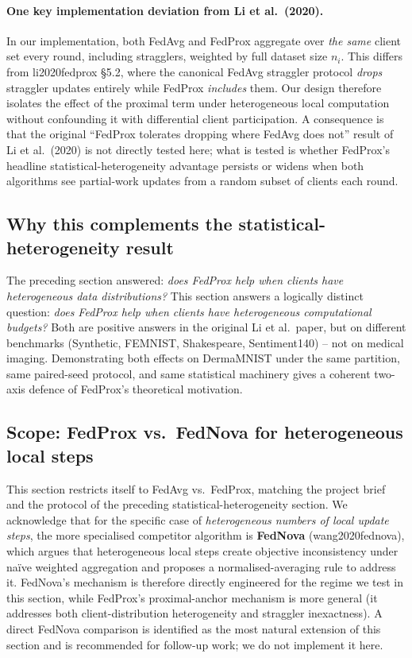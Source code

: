 \documentclass[11pt,a4paper]{article}
\providecommand{\citep}[1]{(#1)}
\providecommand{\citet}[1]{#1}
\begin{document}
\paragraph{One key implementation deviation from Li et al.\ (2020).}
In our implementation, both FedAvg and FedProx aggregate over
\emph{the same} client set every round, including stragglers, weighted
by full dataset size $n_i$. This differs from \citet{li2020fedprox}
§5.2, where the canonical FedAvg straggler protocol \emph{drops}
straggler updates entirely while FedProx \emph{includes} them. Our
design therefore isolates the effect of the proximal term under
heterogeneous local computation without confounding it with
differential client participation. A consequence is that the original
``FedProx tolerates dropping where FedAvg does not'' result of Li
et al.\ (2020) is not directly tested here; what is tested is whether
FedProx's headline statistical-heterogeneity advantage persists or
widens when both algorithms see partial-work updates from a random
subset of clients each round.

\subsection*{Why this complements the statistical-heterogeneity result}

The preceding section answered: \emph{does FedProx help when clients have
heterogeneous data distributions?} This section answers a logically
distinct question: \emph{does FedProx help when clients have heterogeneous
computational budgets?} Both are positive answers in the original Li et
al.\ paper, but on different benchmarks (Synthetic, FEMNIST, Shakespeare,
Sentiment140) -- not on medical imaging. Demonstrating both effects on
DermaMNIST under the same partition, same paired-seed protocol, and same
statistical machinery gives a coherent two-axis defence of FedProx's
theoretical motivation.

\subsection*{Scope: FedProx vs.\ FedNova for heterogeneous local steps}

This section restricts itself to FedAvg vs.\ FedProx, matching the
project brief and the protocol of the preceding statistical-heterogeneity
section. We acknowledge that for the specific case of \emph{heterogeneous
numbers of local update steps}, the more specialised competitor algorithm
is \textbf{FedNova} \citep{wang2020fednova}, which argues that
heterogeneous local steps create objective inconsistency under naïve
weighted aggregation and proposes a normalised-averaging rule to address
it. FedNova's mechanism is therefore directly engineered for the regime
we test in this section, while FedProx's proximal-anchor mechanism is
more general (it addresses both client-distribution heterogeneity and
straggler inexactness). A direct FedNova comparison is identified as
the most natural extension of this section and is recommended for
follow-up work; we do not implement it here.
\end{document}
